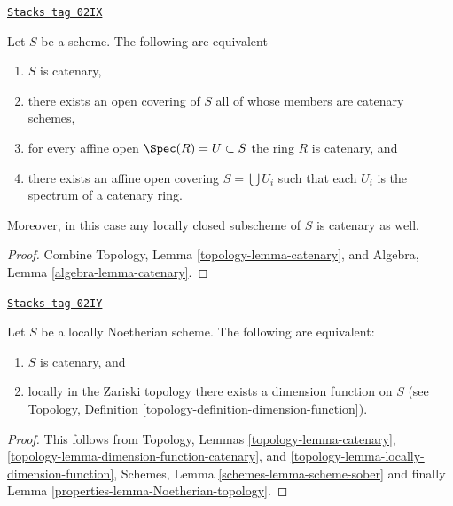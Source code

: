 \begin{lemma}
\label{properties-lemma-catenary-local}
\href{https://stacks.math.columbia.edu/tag/02IX}{\texttt{Stacks tag 02IX}}

Let $S$ be a scheme. The following are equivalent
\begin{enumerate}
\item $S$ is catenary,
\item there exists an open covering of $S$ all of whose members are
catenary schemes,
\item for every affine open $\Spec(R) = U \subset S$ the ring
$R$ is catenary, and
\item there exists an affine open covering $S = \bigcup U_i$ such
that each $U_i$ is the spectrum of a catenary ring.
\end{enumerate}
Moreover, in this case any locally closed subscheme of $S$ is catenary
as well.
\end{lemma}

\begin{proof}
Combine Topology, Lemma \ref{topology-lemma-catenary}, and
Algebra, Lemma \ref{algebra-lemma-catenary}.
\end{proof}

\begin{lemma}
\label{properties-lemma-catenary-dimension-function}
\href{https://stacks.math.columbia.edu/tag/02IY}{\texttt{Stacks tag 02IY}}

Let $S$ be a locally Noetherian scheme.
The following are equivalent:
\begin{enumerate}
\item $S$ is catenary, and
\item locally in the Zariski topology there exists a dimension function
on $S$ (see Topology, Definition \ref{topology-definition-dimension-function}).
\end{enumerate}
\end{lemma}

\begin{proof}

This follows from
Topology, Lemmas
\ref{topology-lemma-catenary},
\ref{topology-lemma-dimension-function-catenary}, and
\ref{topology-lemma-locally-dimension-function},
Schemes, Lemma \ref{schemes-lemma-scheme-sober}
and finally Lemma \ref{properties-lemma-Noetherian-topology}.
\end{proof}

